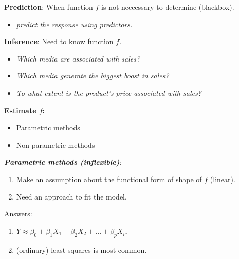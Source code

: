 {\noindent \textbf{Prediction}: When function $f$ is not neccessary to determine (blackbox).
\begin{itemize}
    \item \textit{predict the response using predictors.}
\end{itemize}\vspace{3mm}


\noindent \textbf{Inference}: Need to know function $f$.
\begin{itemize}
    \item \textit{Which media are associated with sales?}
    \item \textit{Which media generate the biggest boost in sales?}
    \item \textit{To what extent is the product's price associated with sales?}
\end{itemize}\vspace{3mm}

\textbf{Estimate $f$:}
\begin{itemize}
    \item Parametric methods
    \item Non-parametric methods
\end{itemize}\vspace{3mm}

\textbf{\textit{Parametric methods (inflexible)}}:
\begin{enumerate}
    \item Make an assumption about the functional form of shape of $f$ (linear).
    \item Need an approach to fit the model.
\end{enumerate}
Answers:
\begin{enumerate}
    \item $Y\approx\beta_0+\beta_1X_1+\beta_2X_2+...+\beta_pX_p$.
    \item (ordinary) least squares is most common.
\end{enumerate}

}
